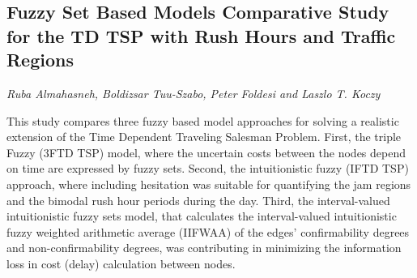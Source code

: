 \documentclass[../booklet.tex]{subfiles}
\begin{document}
\subsection[Fuzzy Set Based Models Comparative Study for the TD TSP with Rush Hours and Traffic Regions. {\it Ruba Almahasneh, Boldizsar Tuu-Szabo, Peter Foldesi and Laszlo T. Koczy}]{Fuzzy Set Based Models Comparative Study for the TD TSP with Rush Hours and Traffic Regions}
   

\begin{center}
  {\it Ruba Almahasneh, Boldizsar Tuu-Szabo, Peter Foldesi and Laszlo T. Koczy}
\end{center}


This study compares three fuzzy based model approaches for solving a realistic extension of the Time Dependent Traveling Salesman Problem. First, the triple Fuzzy (3FTD TSP) model, where the uncertain costs between the nodes depend on time are expressed by fuzzy sets. Second, the intuitionistic fuzzy (IFTD TSP) approach, where including hesitation was suitable for quantifying the jam regions and the bimodal rush hour periods during the day. Third, the interval-valued intuitionistic fuzzy sets model, that calculates the interval-valued intuitionistic fuzzy weighted arithmetic average (IIFWAA) of the edges' confirmability degrees and non-confirmability degrees, was contributing in minimizing the information loss in cost (delay) calculation between nodes.

\end{document}
